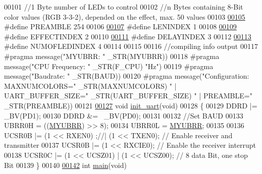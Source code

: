 \begin{DoxyCode}
{00101 \textcolor{comment}{//1 Byte number of LEDs to control}
00102 \textcolor{comment}{//n Bytes containing 8-Bit color values (RGB 3-3-2), depended on the effect, max. 50 values}
00103 
\hypertarget{ws2811lichterkette_8c_source_l00105}{}\hyperlink{ws2811lichterkette_8c_a8aac8c5098aaf915463fb31715efa09f}{00105} \textcolor{preprocessor}{#define PREAMBLE 254        }
00106 
\hypertarget{ws2811lichterkette_8c_source_l00107}{}\hyperlink{ws2811lichterkette_8c_aec9ae4a8d59e838ac8ed93ad0de8e827}{00107} \textcolor{preprocessor}{#define LENINDEX 1          }
00108 
\hypertarget{ws2811lichterkette_8c_source_l00109}{}\hyperlink{ws2811lichterkette_8c_a8d4e4cf47dd6136ace963623e1a8e27c}{00109} \textcolor{preprocessor}{#define EFFECTINDEX 2       }
00110 
\hypertarget{ws2811lichterkette_8c_source_l00111}{}\hyperlink{ws2811lichterkette_8c_a9ff437877d0878dd16eacf103a1e1c40}{00111} \textcolor{preprocessor}{#define DELAYINDEX 3        }
00112 
\hypertarget{ws2811lichterkette_8c_source_l00113}{}\hyperlink{ws2811lichterkette_8c_afbc75dc20761a05dda7cbb70b9b322dd}{00113} \textcolor{preprocessor}{#define NUMOFLEDINDEX 4     }
00114 
00115 
00116 \textcolor{comment}{//compiling info output}
00117 \textcolor{preprocessor}{#pragma message("MYUBRR: " \_STR(MYUBRR))}
00118 \textcolor{preprocessor}{#pragma message("CPU Frequency: " \_STR(F\_CPU) "Hz")}
00119 \textcolor{preprocessor}{#pragma message("Baudrate: " \_STR(BAUD))}
00120 \textcolor{preprocessor}{#pragma message("Configuration: MAXNUMCOLORS=" \_STR(MAXNUMCOLORS)  " | UART\_BUFFER\_SIZE="
       \_STR(UART\_BUFFER\_SIZE) " | PREAMBLE=" \_STR(PREAMBLE))}
00121 
\hypertarget{ws2811lichterkette_8c_source_l00127}{}\hyperlink{ws2811lichterkette_8c_ac7b3df0fa68526d64c732d5f916e34b1}{00127} \textcolor{keywordtype}{void} \hyperlink{ws2811lichterkette_8c_ac7b3df0fa68526d64c732d5f916e34b1}{init\_uart}(\textcolor{keywordtype}{void})
00128 \{
00129     DDRD |= \_BV(PD1);
00130     DDRD &= ~\_BV(PD0);
00131     
00132      \textcolor{comment}{//Set BAUD}
00133      UBRR0H = ((\hyperlink{ws2811lichterkette_8c_a711e9130c825a7269c8c87dbb57a85e0}{MYUBRR}) >> 8);
00134      UBRR0L = \hyperlink{ws2811lichterkette_8c_a711e9130c825a7269c8c87dbb57a85e0}{MYUBRR};
00135      
00136      UCSR0B |= (1 << RXEN0) ;\textcolor{comment}{//| (1 << TXEN0);     // Enable receiver and transmitter}
00137      UCSR0B |= (1 << RXCIE0);                   \textcolor{comment}{// Enable the receiver interrupt}
00138      UCSR0C |= (1 << UCSZ01) | (1 << UCSZ00);   \textcolor{comment}{// 8 data Bit, one stop Bit}
00139 \}
00140 
\hypertarget{ws2811lichterkette_8c_source_l00142}{}\hyperlink{ws2811lichterkette_8c_a840291bc02cba5474a4cb46a9b9566fe}{00142} \textcolor{keywordtype}{int} \hyperlink{ws2811lichterkette_8c_a840291bc02cba5474a4cb46a9b9566fe}{main}(\textcolor{keywordtype}{void})
}
\end{DoxyCode}
